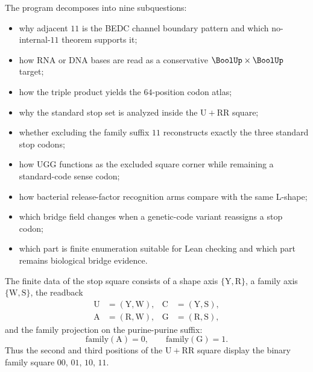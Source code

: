 \begin{definition}
\label{def:philosophy-zterm-research-subquestions}
The program decomposes into nine subquestions:
\begin{itemize}
  \item why adjacent $11$ is the BEDC channel boundary pattern and which
    no-internal-$11$ theorem supports it;
  \item how RNA or DNA bases are read as a conservative
    $\BoolUp\times\BoolUp$ target;
  \item how the triple product yields the $64$-position codon atlas;
  \item why the standard stop set is analyzed inside the
    $\mathrm{U}+\mathrm{RR}$ square;
  \item whether excluding the family suffix $11$ reconstructs exactly
    the three standard stop codons;
  \item how $\mathrm{UGG}$ functions as the excluded square corner while
    remaining a standard-code sense codon;
  \item how bacterial release-factor recognition arms compare with the
    same L-shape;
  \item which bridge field changes when a genetic-code variant reassigns
    a stop codon;
  \item which part is finite enumeration suitable for Lean checking and
    which part remains biological bridge evidence.
\end{itemize}
\end{definition}

\begin{definition}
\label{def:philosophy-four-phase-stop-square-data}
The finite data of the stop square consists of a shape axis
$\{\mathrm{Y},\mathrm{R}\}$, a family axis
$\{\mathrm{W},\mathrm{S}\}$, the readback
$$
\begin{aligned}
  \mathrm{U} &= (\mathrm{Y},\mathrm{W}),&
  \mathrm{C} &= (\mathrm{Y},\mathrm{S}),\\
  \mathrm{A} &= (\mathrm{R},\mathrm{W}),&
  \mathrm{G} &= (\mathrm{R},\mathrm{S}),
\end{aligned}
$$
and the family projection on the purine-purine suffix:
$$
  \mathrm{family}(\mathrm{A})=0,\qquad
  \mathrm{family}(\mathrm{G})=1.
$$
Thus the second and third positions of the
$\mathrm{U}+\mathrm{RR}$ square display the binary family square
$00$, $01$, $10$, $11$.
\end{definition}

